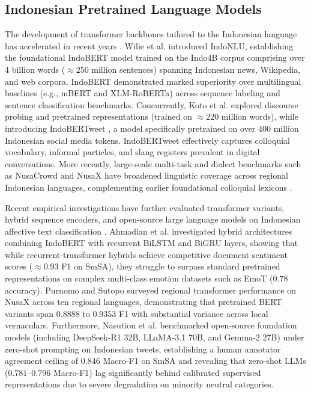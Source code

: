 \documentclass{ieeeaccess}
\begin{document}
\subsection{Indonesian Pretrained Language Models}
\label{subsec:indo_plms}

The development of transformer backbones \cite{vaswani2017attention, devlin2019bert} tailored to the Indonesian language has accelerated in recent years \cite{wilie2020indonlu, koto2020indolem, cahyawijaya2021indonlg}. Wilie et al. \cite{wilie2020indonlu} introduced IndoNLU, establishing the foundational IndoBERT model trained on the Indo4B corpus comprising over 4 billion words ($\approx 250$ million sentences) spanning Indonesian news, Wikipedia, and web corpora. IndoBERT demonstrated marked superiority over multilingual baselines (e.g., mBERT and XLM-RoBERTa) across sequence labeling and sentence classification benchmarks. Concurrently, Koto et al. \cite{koto2020indolem, koto2021discourse} explored discourse probing and pretrained representations (trained on $\approx 220$ million words), while introducing IndoBERTweet \cite{koto2021indobertweet}, a model specifically pretrained on over 400 million Indonesian social media tokens. IndoBERTweet effectively captures colloquial vocabulary, informal particles, and slang registers prevalent in digital conversations. More recently, large-scale multi-task and dialect benchmarks such as NusaCrowd \cite{cahyawijaya2023nusacrowd} and NusaX \cite{winata2023nusax} have broadened linguistic coverage across regional Indonesian languages, complementing earlier foundational colloquial lexicons \cite{salsabila2018colloquial}.

Recent empirical investigations have further evaluated transformer variants, hybrid sequence encoders, and open-source large language models on Indonesian affective text classification \cite{ahmadian2024hybrid, purnomo2024comparison, nasution2025benchmarking}. Ahmadian et al. \cite{ahmadian2024hybrid} investigated hybrid architectures combining IndoBERT with recurrent BiLSTM and BiGRU layers, showing that while recurrent-transformer hybrids achieve competitive document sentiment scores ($\approx 0.93$ F1 on SmSA), they struggle to surpass standard pretrained representations on complex multi-class emotion datasets such as EmoT ($0.78$ accuracy). Purnomo and Sutopo \cite{purnomo2024comparison} surveyed regional transformer performance on NusaX across ten regional languages, demonstrating that pretrained BERT variants span $0.8888$ to $0.9353$ F1 with substantial variance across local vernaculars. Furthermore, Nasution et al. \cite{nasution2025benchmarking} benchmarked open-source foundation models (including DeepSeek-R1 32B, LLaMA-3.1 70B, and Gemma-2 27B) under zero-shot prompting on Indonesian tweets, establishing a human annotator agreement ceiling of $0.846$ Macro-F1 on SmSA and revealing that zero-shot LLMs ($0.781$–$0.796$ Macro-F1) lag significantly behind calibrated supervised representations due to severe degradation on minority neutral categories. 
\end{document}
